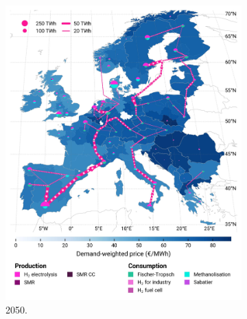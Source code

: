 \documentclass[preprint,12pt,sort&compress]{elsarticle}
\begin{document}
\begin{figure}[htbp]
\begin{subfigure}[t]{0.4\textwidth}
      \includegraphics[width=1\textwidth,trim=0cm 0cm 0cm 0cm, clip]{maps/pcipmi/base_s_adm___2050-balance_map_H2}
      \vspace{-0.5cm}
      \caption{ 2050.}
      \label{fig:PCI_lt_2050_h2}
  \end{subfigure}
  \hfill
  \begin{subfigure}[t]{0.4\textwidth}
      \vspace{0pt}

\end{subfigure}
\end{figure}
\end{document}
